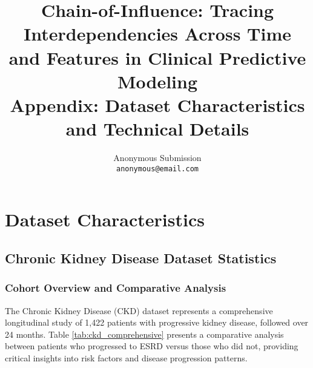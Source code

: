 \documentclass[letterpaper]{article}
\title{Chain-of-Influence: Tracing Interdependencies Across Time and Features in Clinical Predictive Modeling\\
\large{\textbf{Appendix: Dataset Characteristics and Technical Details}}}
\author{
    Anonymous Submission\\
    \texttt{anonymous@email.com}
}
\begin{document}
\maketitle

\section{Dataset Characteristics}

\subsection{Chronic Kidney Disease Dataset Statistics}

\subsubsection{Cohort Overview and Comparative Analysis}

The Chronic Kidney Disease (CKD) dataset represents a comprehensive longitudinal study of 1,422 patients with progressive kidney disease, followed over 24 months. Table \ref{tab:ckd_comprehensive} presents a comparative analysis between patients who progressed to ESRD versus those who did not, providing critical insights into risk factors and disease progression patterns.
\end{document}
